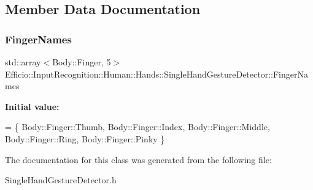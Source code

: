 \subsection{Member Data Documentation}
\hypertarget{class_efficio_1_1_input_recognition_1_1_human_1_1_hands_1_1_single_hand_gesture_detector_a1dda643bda61df03535396dd659acb91}{}\label{class_efficio_1_1_input_recognition_1_1_human_1_1_hands_1_1_single_hand_gesture_detector_a1dda643bda61df03535396dd659acb91} 
\subsubsection{\texorpdfstring{Finger\+Names}{FingerNames}}
{\footnotesize\ttfamily std\+::array$<$Body\+::\+Finger, 5$>$ Efficio\+::\+Input\+Recognition\+::\+Human\+::\+Hands\+::\+Single\+Hand\+Gesture\+Detector\+::\+Finger\+Names\hspace{0.3cm}{\ttfamily [protected]}}

{\bfseries Initial value\+:}
\begin{DoxyCode}
= 
                    \{ 
                        Body::Finger::Thumb,
                        Body::Finger::Index,
                        Body::Finger::Middle, 
                        Body::Finger::Ring,
                        Body::Finger::Pinky
                    \}
\end{DoxyCode}


The documentation for this class was generated from the following file\+:\begin{DoxyCompactItemize}
\item 
Single\+Hand\+Gesture\+Detector.\+h\end{DoxyCompactItemize}
